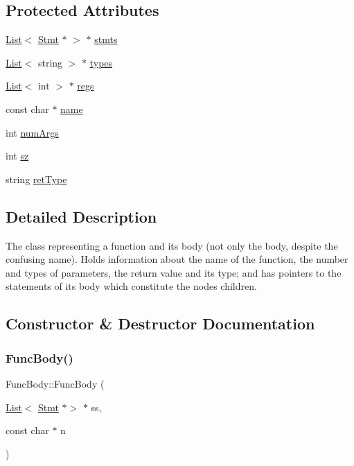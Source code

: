 \subsection*{Protected Attributes}
\begin{DoxyCompactItemize}
\item 
\hyperlink{class_list}{List}$<$ \hyperlink{class_stmt}{Stmt} $\ast$ $>$ $\ast$ \hyperlink{class_func_body_a1946b17051da22b95c723dac2604b7b1}{stmts}
\item 
\hyperlink{class_list}{List}$<$ string $>$ $\ast$ \hyperlink{class_func_body_ab658c76bb42d23b067c1b1860ddcf9f9}{types}
\item 
\hyperlink{class_list}{List}$<$ int $>$ $\ast$ \hyperlink{class_func_body_a48a90d46d3c6f767f1a6595c312af970}{regs}
\item 
const char $\ast$ \hyperlink{class_func_body_a48458c543d655ef7f25c3cbe3206e4b2}{name}
\item 
int \hyperlink{class_func_body_a659a0db3f1626e1e03a7fd86e1d38283}{num\+Args}
\item 
int \hyperlink{class_func_body_a6f19667df9a4f9662fdbaec70c932394}{sz}
\item 
string \hyperlink{class_func_body_ac471c93e30501d687d59aa752a5a312f}{ret\+Type}
\end{DoxyCompactItemize}


\subsection{Detailed Description}
The class representing a function and its body (not only the body, despite the confusing name). Holds information about the name of the function, the number and types of parameters, the return value and its type; and has pointers to the statements of its body which constitute the node\textquotesingle{}s children. 

\subsection{Constructor \& Destructor Documentation}
\mbox{\label{class_func_body_a13878f3d52215a31d38a6a593d29fe7a}} 
\subsubsection{\texorpdfstring{Func\+Body()}{FuncBody()}}
{\footnotesize\ttfamily Func\+Body\+::\+Func\+Body (\begin{DoxyParamCaption}\item[{\hyperlink{class_list}{List}$<$ \hyperlink{class_stmt}{Stmt} $\ast$$>$ $\ast$}]{ss,  }\item[{const char $\ast$}]{n }\end{DoxyParamCaption})}

